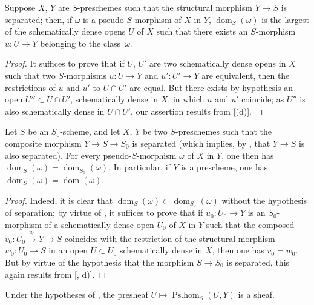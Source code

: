 \begin{proposition}[20.2.4]
\label{IV.20.2.4}
Suppose $X$, $Y$ are $S$-preschemes such that the structural morphism $Y\to S$ is separated;
then, if $\omega$ is a pseudo-$S$-morphism of $X$ in $Y$, $\operatorname{dom}_S(\omega)$ is the largest of the schematically dense opens $U$ of $X$ such that there exists an $S$-morphism $u:U\to Y$ belonging to the class~$\omega$.
\end{proposition}

\begin{proof}
It suffices to prove that if $U$, $U'$ are two schematically dense opens in $X$ such that two $S$-morphisms $u:U\to Y$ and $u':U'\to Y$ are equivalent, then the restrictions of $u$ and $u'$ to $U\cap U'$ are equal.
But there exists by hypothesis an open $U''\subset U\cap U'$, schematically dense in $X$, in which $u$ and $u'$ coincide;
as $U''$ is also schematically dense in $U\cap U'$, our assertion results from [(d)].
\end{proof}

\begin{corollary}[20.2.5]
\label{IV.20.2.5}
Let $S$ be an $S_0$-scheme, and let $X$, $Y$ be two $S$-preschemes such that the composite morphism $Y\to S\to S_0$ is separated (which implies, by , that $Y\to S$ is also separated).
For every pseudo-$S$-morphism $\omega$ of $X$ in $Y$, one then has $\operatorname{dom}_S(\omega)=\operatorname{dom}_{S_0}(\omega)$.
In particular, if $Y$ is a prescheme, one has $\operatorname{dom}_S(\omega)=\operatorname{dom}(\omega)$.
\end{corollary}

\begin{proof}
Indeed, it is clear that $\operatorname{dom}_S(\omega)\subset\operatorname{dom}_{S_0}(\omega)$ without the hypothesis of separation;
by virtue of , it suffices to prove that if $u_0:U_0\to Y$ is an $S_0$-morphism of a
schematically dense open $U_0$ of $X$ in $Y$ such that the composed $v_0:U_0\xrightarrow{u_0}Y\to S$ coincides with the restriction of the structural morphism $w_0:U_0\to S$ in an open $U\subset U_0$ schematically dense in $X$, then one has $v_0=w_0$.
But by virtue of the hypothesis that the morphism $S\to S_0$ is separated, this again results from [, d)].
\end{proof}

\begin{corollary}[20.2.6]
\label{IV.20.2.6}
Under the hypotheses of , the presheaf $U\mapsto\operatorname{Ps.hom}_S(U,Y)$ is a sheaf.
\end{corollary}

